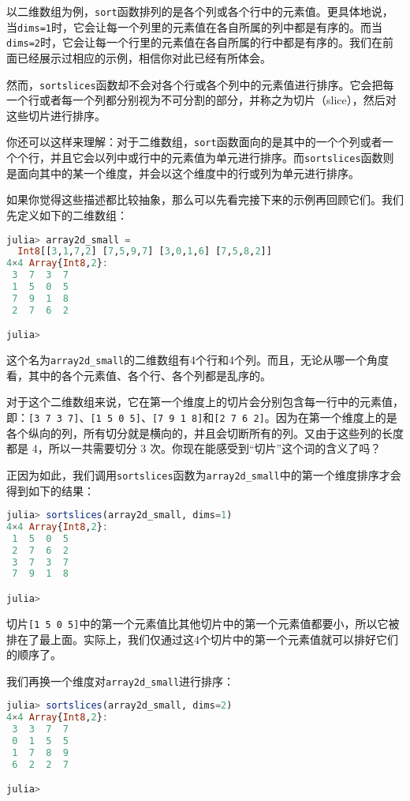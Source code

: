 以二维数组为例，\verb|sort|函数排列的是各个列或各个行中的元素值。更具体地说，当\verb|dims=1|时，它会让每一个列里的元素值在各自所属的列中都是有序的。而当\verb|dims=2|时，它会让每一个行里的元素值在各自所属的行中都是有序的。我们在前面已经展示过相应的示例，相信你对此已经有所体会。

然而，\verb|sortslices|函数却不会对各个行或各个列中的元素值进行排序。它会把每一个行或者每一个列都分别视为不可分割的部分，并称之为切片（slice），然后对这些切片进行排序。

你还可以这样来理解：对于二维数组，\verb|sort|函数面向的是其中的一个个列或者一个个行，并且它会以列中或行中的元素值为单元进行排序。而\verb|sortslices|函数则是面向其中的某一个维度，并会以这个维度中的行或列为单元进行排序。

如果你觉得这些描述都比较抽象，那么可以先看完接下来的示例再回顾它们。我们先定义如下的二维数组：

\begin{lstlisting}[language=julia]
julia> array2d_small = 
  Int8[[3,1,7,2] [7,5,9,7] [3,0,1,6] [7,5,8,2]]
4×4 Array{Int8,2}:
 3  7  3  7
 1  5  0  5
 7  9  1  8
 2  7  6  2

julia> 
\end{lstlisting}

这个名为\verb|array2d_small|的二维数组有4个行和4个列。而且，无论从哪一个角度看，其中的各个元素值、各个行、各个列都是乱序的。

对于这个二维数组来说，它在第一个维度上的切片会分别包含每一行中的元素值，即：\verb|[3 7 3 7]|、\verb|[1 5 0 5]|、\verb|[7 9 1 8]|和\verb|[2 7 6 2]|。因为在第一个维度上的是各个纵向的列，所有切分就是横向的，并且会切断所有的列。又由于这些列的长度都是 4，所以一共需要切分 3 次。你现在能感受到“切片”这个词的含义了吗？

正因为如此，我们调用\verb|sortslices|函数为\verb|array2d_small|中的第一个维度排序才会得到如下的结果：

\begin{lstlisting}[language=julia]
julia> sortslices(array2d_small, dims=1)
4×4 Array{Int8,2}:
 1  5  0  5
 2  7  6  2
 3  7  3  7
 7  9  1  8

julia> 
\end{lstlisting}

切片\verb|[1 5 0 5]|中的第一个元素值比其他切片中的第一个元素值都要小，所以它被排在了最上面。实际上，我们仅通过这4个切片中的第一个元素值就可以排好它们的顺序了。

我们再换一个维度对\verb|array2d_small|进行排序：

\begin{lstlisting}[language=julia]
julia> sortslices(array2d_small, dims=2)
4×4 Array{Int8,2}:
 3  3  7  7
 0  1  5  5
 1  7  8  9
 6  2  2  7

julia> 
\end{lstlisting}

